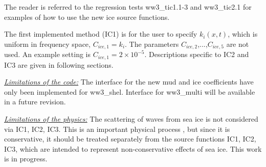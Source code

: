 The reader is referred to the regression tests {\file ww3\_tic1.1-3} and
{\file ww3\_tic2.1} for examples of how to use the new ice source functions.

The first implemented method ({\code IC1}) is for the user to specify
${k_i(x,t)}$, which is uniform in frequency space, ${C_{ice,1}}={k_i}$. The
parameters ${C_{ice,2}}$,...,${C_{ice,5}}$ are not used. An example setting
is ${C_{ice,1}}=2\times 10^{-5}$. Descriptions specific to IC2 and IC3 are given in 
following sections. 

\textrm{\textit{\underline{Limitations of the code:}}} The interface for the
new mud and ice coefficients have only been implemented for {\file
ww3\_shel}. Interface for {\file ww3\_multi} will be available in a future
revision.  

\textrm{\textit{\underline{Limitations of the physics:}}} The
scattering of waves from sea ice is not considered via {\code IC1}, {\code
IC2}, {\code IC3}. This is an important physical process \citep{art:Wad75},
but since it is conservative, it should be treated separately from the source
functions {\code IC1}, {\code IC2}, {\code IC3}, which are intended to
represent non-conservative effects of sea ice. This work is in progress.
